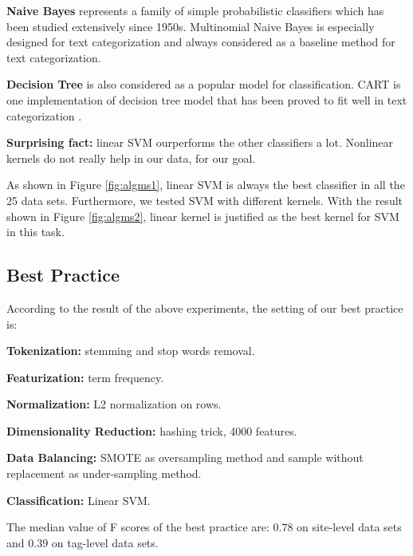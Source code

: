 \documentclass{sig-alternate-05-2015}
\begin{document}
\textbf{Naive Bayes} represents a family of simple probabilistic classifiers which has been studied extensively since 1950s. Multinomial Naive Bayes is especially designed for text categorization \cite{mccallum1998comparison} and always considered as a baseline method for text categorization. 

\textbf{Decision Tree} is also considered as a popular model for classification. CART is one implementation of decision tree model that has been proved to fit well in text categorization \cite{miotto2005supporting}.


\textbf{Surprising fact:} linear SVM ourperforms the other classifiers a lot. Nonlinear kernels do not really help in our data, for our goal.

As shown in Figure \ref{fig:algms1}, linear SVM is always the best classifier in all the 25 data sets. Furthermore, we tested SVM with different kernels. With the result shown in Figure \ref{fig:algms2}, linear kernel is justified as the best kernel for SVM in this task.


\subsection{Best Practice}

According to the result of the above experiments, the setting of our best practice is:

\textbf{Tokenization:} stemming and stop words removal.

\textbf{Featurization:} term frequency.

\textbf{Normalization:} L2 normalization on rows.

\textbf{Dimensionality Reduction:} hashing trick, 4000 features.

\textbf{Data Balancing:} SMOTE as oversampling method and sample without replacement as under-sampling method.

\textbf{Classification:} Linear SVM.

The median value of F scores of the best practice are: $0.78$ on site-level data sets and $0.39$ on tag-level data sets. 
\end{document}
